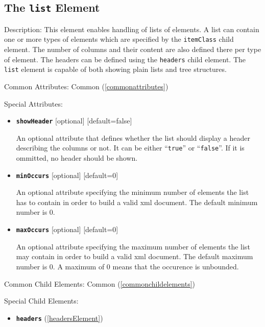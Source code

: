 \subsection{ The \texttt{list} Element}
\begin{description}
 \item Description: This element enables handling of lists of elements. A list can contain one or more types of elements which are specified by the \texttt{itemClass} child element. The number of columns and their content are also defined there per type of element. The headers can be defined using the \texttt{headers} child element. The \texttt{list} element is capable of both showing plain lists and tree structures.

 \item Common Attributes: Common (\ref{commonattributes})

 \item Special Attributes:

\begin{itemize}
 \item \textbf{\texttt{showHeader}} [optional] [default=false]

An optional attribute that defines whether the list should display a header describing the columns or not. It can be either ``\texttt{true}'' or ``\texttt{false}''. If it is ommitted, no header should be shown.

 \item \textbf{\texttt{minOccurs}} [optional] [default=0]

An optional attribute specifying the minimum number of elements the list has to contain in order to build a valid xml document. The default minimum number is 0.

 \item \textbf{\texttt{maxOccurs}} [optional] [default=0]

An optional attribute specifying the maximum number of elements the list may contain in order to build a valid xml document. The default maximum number is 0. A maximum of 0 means that the occurence is unbounded.
\end{itemize}


 \item Common Child Elements: Common (\ref{commonchildelements})

 \item Special Child Elements:

\begin{itemize}
 \item \textbf{\texttt{headers}} (\ref{headersElement})


\end{itemize}
\end{description}
